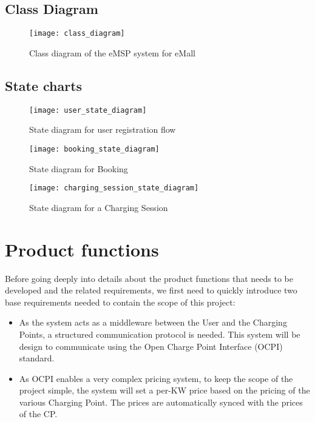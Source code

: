 \newpage

\subsection{Class Diagram}

\begin{figure}[h]
\centering
\texttt{[image: class\_diagram]}
\caption{Class diagram of the eMSP system for eMall}
\end{figure}

\clearpage
\newpage

\subsection{State charts}

\begin{figure}[h]
\centering
\texttt{[image: user\_state\_diagram]}
\caption{State diagram for user registration flow}
\end{figure}

\begin{figure}[h]
\centering
\texttt{[image: booking\_state\_diagram]}
\caption{State diagram for Booking}
\end{figure}

\begin{figure}[h]
\centering
\texttt{[image: charging\_session\_state\_diagram]}
\caption{State diagram for a Charging Session}
\end{figure}

\clearpage
\newpage


\section{Product functions}
Before going deeply into details about the product functions that needs to be developed and the related requirements, we first need to quickly introduce two base requirements needed to contain the scope of this project:\\

\begin{itemize}
	\item As the system acts as a middleware between the User and the Charging Points, a structured communication protocol is needed. This system will be design to communicate using the Open Charge Point Interface (OCPI) standard.
	\item As OCPI enables a very complex pricing system, to keep the scope of the project simple, the system will set a per-KW price based on the pricing of the various Charging Point. The prices are automatically synced with the prices of the CP.
\end{itemize}

